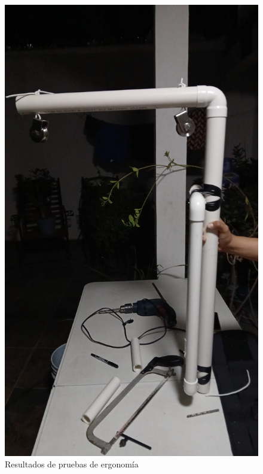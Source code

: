 \begin{figure}
    \centering
    \includegraphics[width=1\textwidth, height=.9\textheight]{img/PruebaErgonomica5.png}
    \caption{Resultados de pruebas de ergonomía}
    \label{fig:ergo-test}
\end{figure}

